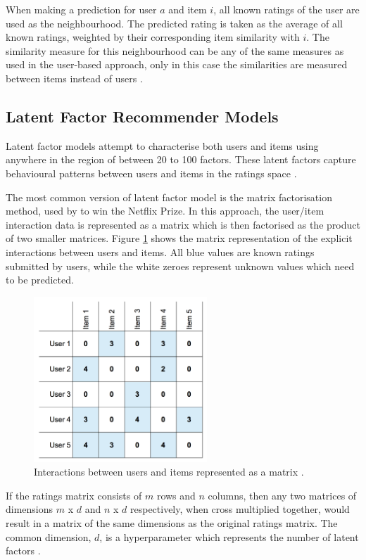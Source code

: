 When making a prediction for user $a$ and item $i$, all known ratings of the user are used as the neighbourhood. The predicted rating is taken as the average of all known ratings, weighted by their corresponding item similarity with $i$. The similarity measure for this neighbourhood can be any of the same measures as used in the user-based approach, only in this case the similarities are measured between items instead of users \parencite{handbook_1.4_neighbourhood}.

\subsection{Latent Factor Recommender Models}
Latent factor models attempt to characterise both users and items using anywhere in the region of between 20 to 100 factors. These latent factors capture behavioural patterns between users and items in the ratings space \parencite{koren2009matrix}.

The most common version of latent factor model is the matrix factorisation method, used by \cite{bellkor_2008} to win the Netflix Prize. In this approach, the user/item interaction data is represented as a matrix which is then factorised as the product of two smaller matrices. Figure \ref{fig:matrix} shows the matrix representation of the explicit interactions between users and items. All blue values are known ratings submitted by users, while the white zeroes represent unknown values which need to be predicted.

\begin{figure}[H]
\centering
\includegraphics[width=6.5cm]{Figures/2_3_matrix.png}
\decoRule
\caption[Ratings-matrix]{Interactions between users and items represented as a matrix \parencite{bailey_2016}.}
\label{fig:matrix}
\end{figure}

If the ratings matrix consists of $m$ rows and $n$ columns, then any two matrices of dimensions $m$ x $d$ and $n$ x $d$ respectively, when cross multiplied together, would result in a matrix of the same dimensions as the original ratings matrix. The common dimension, $d$, is a hyperparameter which represents the number of latent factors \parencite{bailey_2016}.

